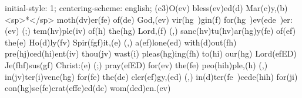initial-style: 1;
centering-scheme: english;
(c3)O(ev) bless(ev)ed(d) Mar(c)y,(b) <sp>*</sp> moth(dv)er(fe) of(de) God,(ev) vir(hg~)gin(f) for(hg~)ev(ede~)er:(ev) (;) tem(hv)ple(iv) of(h) the(hg) Lord,(f) (,) sanc(hv)tu(hv)ar(hg)y(fe) of(ef) the(e) Ho(d)ly(fv) Spir(fgf)it,(e) (,) a(ef)lone(ed) with(d)out(fh) pre(hj)ced(hi)ent(iv) thou(jv) wast(i) pleas(hg)ing(fh) to(hi) our(hg) Lord(efED) Je(fhf)sus(gf) Christ:(e) (;) pray(efED) for(ev) the(fe) peo(hih)ple,(h) (,) in(jv)ter(i)vene(hg) for(fe) the(de) cler(ef)gy,(ed) (,) in(d)ter(fe~)cede(hih) for(ji) con(hg)se(fe)crat(effe)ed(dc) wom(ded)en.(ev)
